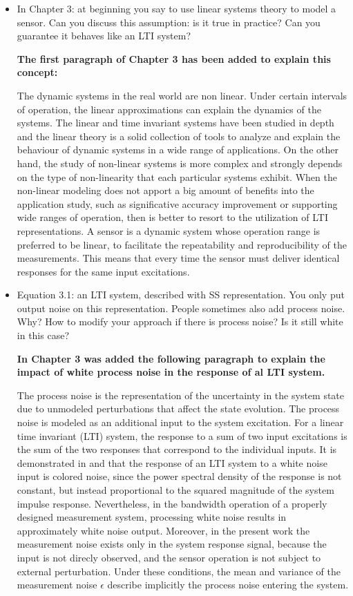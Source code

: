\documentclass[11pt]{article}
\begin{document}
\begin{itemize}
	
	\item  In Chapter 3: at beginning you say to use linear systems theory to model a sensor. Can you discuss this assumption: is it true in practice? Can you guarantee it behaves like an LTI system?
	
	{\bfseries The first paragraph of Chapter 3 has been added to explain this concept:  }
	
	\color{blue}
    The dynamic systems in the real world are non linear. 
    Under certain intervals of operation, the linear approximations can explain the dynamics of the systems. 
    The linear and time invariant systems have been studied in depth and the linear theory is a solid collection of tools to analyze and explain the behaviour of dynamic systems in a wide range of applications. 
    On the other hand, the study of non-linear systems is more complex and strongly depends on the type of non-linearity that each particular systems exhibit. 
    When the non-linear modeling does not apport a big amount of benefits into the application study, such as significative accuracy improvement or supporting wide ranges of operation, then is better to resort to the utilization of LTI representations. 
    A sensor is a dynamic system whose operation range is preferred to be linear, to facilitate the repeatability and reproducibility of the measurements.
    This means that every time the sensor must deliver identical responses for the same input excitations.   
    \color{black}

	\item  Equation 3.1: an LTI system, described with SS representation. You only put output noise on this representation. People sometimes also add process noise. Why? How to modify your approach if there is process noise? Is it still white in this case?
	
	{\bfseries In Chapter 3 was added the following paragraph to explain the impact of white process noise in the response of al LTI system. }
	
	\color{blue} 
    The process noise is the representation of the uncertainty in the system state due to unmodeled perturbations that affect the state evolution. 
    The process noise is modeled as an additional input to the system excitation. 
    For a linear time invariant (LTI) system, the response to a sum of two input excitations is the sum of the two responses that correspond to the individual inputs.
    It is demonstrated in \cite{Gubner06} and \cite{Smith11} that the response of an LTI system to a white noise input is colored noise, since the power spectral density of the response is not constant, but instead proportional to the squared magnitude of the system impulse response.
    Nevertheless, in the bandwidth operation of a properly designed measurement system, processing white noise results in approximately white noise output. 
    Moreover, in the present work the measurement noise exists only in the system response signal, because the input is not direcly observed, and the sensor operation is not subject to external perturbation. 
    Under these conditions, the mean and variance of the measurement noise $\epsilon$ describe implicitly the process noise entering the system. 
    \color{black}


\end{itemize}
\end{document}
